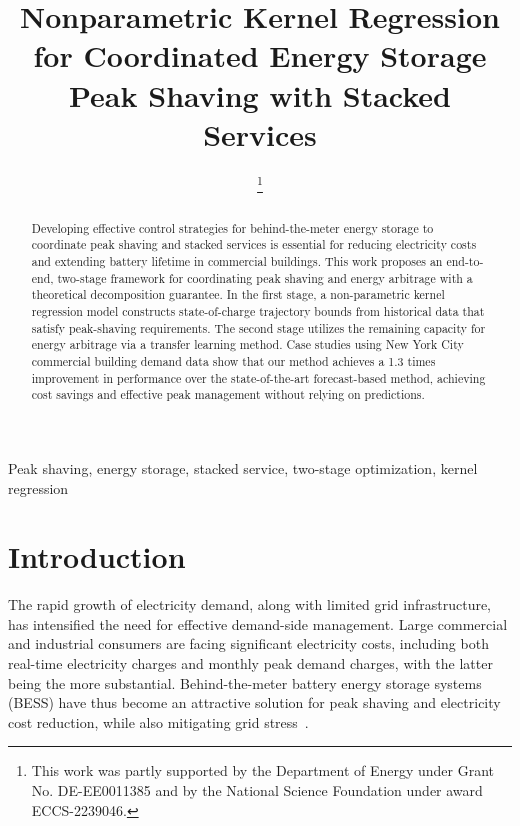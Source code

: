 \documentclass[conference]{IEEEtran}
\begin{document}
 \title{Nonparametric Kernel Regression for Coordinated Energy Storage Peak Shaving with Stacked Services}
\author{ 
\vspace{-0.5cm}
\thanks{This work was partly supported by the Department of Energy under Grant No. DE-EE0011385 and by the National Science Foundation under award ECCS-2239046. }
}

\maketitle

\begin{abstract}

Developing effective control strategies for behind-the-meter energy storage to coordinate peak shaving and stacked services is essential for reducing electricity costs and extending battery lifetime in commercial buildings. This work proposes an end-to-end, two-stage framework for coordinating peak shaving and energy arbitrage with a theoretical decomposition guarantee. In the first stage, a non-parametric kernel regression model constructs state-of-charge trajectory bounds from historical data that satisfy peak-shaving requirements. The second stage utilizes the remaining capacity for energy arbitrage via a transfer learning method. Case studies using New York City commercial building demand data show that our method achieves a 1.3 times improvement in performance over the state-of-the-art forecast-based method, achieving cost savings and effective peak management without relying on predictions.
\end{abstract}
\begin{IEEEkeywords}
Peak shaving, energy storage, stacked service, two-stage optimization, kernel regression
\end{IEEEkeywords}


\section{Introduction}

The rapid growth of electricity demand, along with limited grid infrastructure, has intensified the need for effective demand-side management. Large commercial and industrial consumers are facing significant electricity costs, including both real-time electricity charges and monthly peak demand charges, with the latter being the more substantial. Behind-the-meter battery energy storage systems (BESS) have thus become an attractive solution for peak shaving and electricity cost reduction, while also mitigating grid stress~\cite{li2023dynamic,Mirletz2023}.
\end{document}
